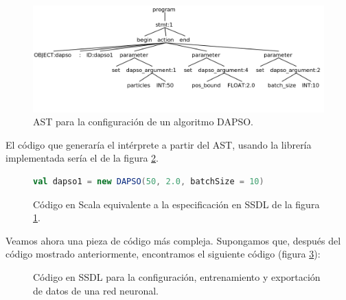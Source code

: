 \begin{figure}[ht!]
    \centering
    \includegraphics[width=1\linewidth]{img/dapso_ast.png}
    \caption{AST para la configuración de un algoritmo DAPSO.}
    \label{fig:dapso-ast}
\end{figure}

\vspace{10pt}
El código que generaría el intérprete a partir del AST, usando la librería implementada sería el de la figura 
\ref{fig:dapso-ssdl-scala}.

\vspace{10pt}
\begin{figure}[ht!]
    \begin{lstlisting}[language=Scala]
val dapso1 = new DAPSO(50, 2.0, batchSize = 10)
    \end{lstlisting}
    \caption{Código en Scala equivalente a la especificación en SSDL de la figura \ref{fig:dapso-ast}.}
    \label{fig:dapso-ssdl-scala}
\end{figure}

Veamos ahora una pieza de código más compleja. Supongamos que, después del código mostrado anteriormente, encontramos el 
siguiente código (figura \ref{fig:ann-ssdl}):

\begin{figure}[ht!]
    \centering
    
    \caption{Código en SSDL para la configuración, entrenamiento y exportación de datos de una red neuronal.}
    \label{fig:ann-ssdl}
\end{figure}

